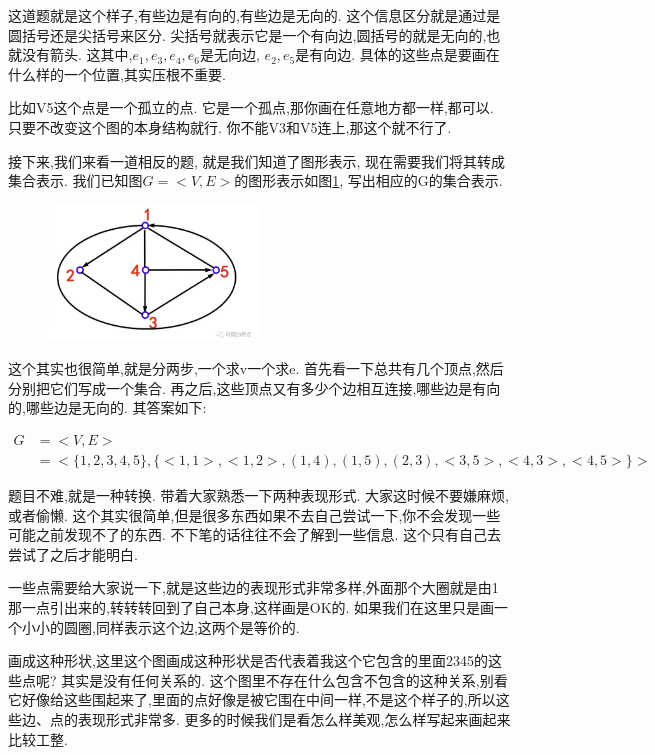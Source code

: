 这道题就是这个样子,有些边是有向的,有些边是无向的. 这个信息区分就是通过是圆括号还是尖括号来区分. 尖括号就表示它是一个有向边,圆括号的就是无向的,也就没有箭头. 这其中,$e_1, e_3, e_4, e_6$是无向边, $e_2, e_5$是有向边. 具体的这些点是要画在什么样的一个位置,其实压根不重要. 

比如V5这个点是一个孤立的点. 它是一个孤点,那你画在任意地方都一样,都可以. 只要不改变这个图的本身结构就行. 你不能V3和V5连上,那这个就不行了. 

接下来,我们来看一道相反的题, 就是我们知道了图形表示, 现在需要我们将其转成集合表示. 我们已知图$G=<V,E>$的图形表示如图\ref{fig:img25_2}, 写出相应的G的集合表示. 

\begin{figure}[ht]
  \centering
  \includegraphics[width=0.5\textwidth]{asset/20231227145043.png}
  \caption{}
  \label{fig:img25_2}
\end{figure}

这个其实也很简单,就是分两步,一个求v一个求e. 首先看一下总共有几个顶点,然后分别把它们写成一个集合. 再之后,这些顶点又有多少个边相互连接,哪些边是有向的,哪些边是无向的. 其答案如下: 

\begin{align*}
  G & = <V, E> \\ & = <\{1, 2, 3, 4, 5\}, \{<1, 1>,<1, 2>,(1, 4),(1, 5),(2, 3),<3, 5>,<4, 3>,<4, 5>\}>
\end{align*}

题目不难,就是一种转换. 带着大家熟悉一下两种表现形式. 大家这时候不要嫌麻烦,或者偷懒. 这个其实很简单,但是很多东西如果不去自己尝试一下,你不会发现一些可能之前发现不了的东西. 不下笔的话往往不会了解到一些信息. 这个只有自己去尝试了之后才能明白. 

一些点需要给大家说一下,就是这些边的表现形式非常多样,外面那个大圈就是由1那一点引出来的,转转转回到了自己本身,这样画是OK的. 如果我们在这里只是画一个小小的圆圈,同样表示这个边,这两个是等价的. 

画成这种形状,这里这个图画成这种形状是否代表着我这个它包含的里面2345的这些点呢? 其实是没有任何关系的. 这个图里不存在什么包含不包含的这种关系,别看它好像给这些围起来了,里面的点好像是被它围在中间一样,不是这个样子的,所以这些边、点的表现形式非常多. 更多的时候我们是看怎么样美观,怎么样写起来画起来比较工整. 


